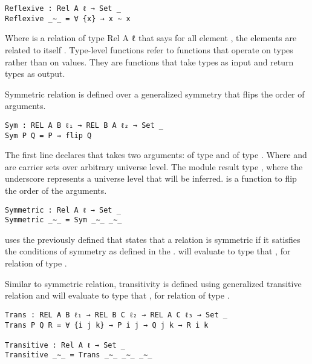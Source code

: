 \begin{verbatim}
Reflexive : Rel A ℓ → Set _
Reflexive _∼_ = ∀ {x} → x ∼ x
\end{verbatim}

Where  is a relation of type {Rel A ℓ} that says for all element
, the elements are related to itself . Type-level
functions refer to functions that operate on types rather than on values. They
are functions that take types as input and return types as output.

Symmetric relation is defined over a generalized symmetry that flips the order of arguments.

\begin{verbatim}
Sym : REL A B ℓ₁ → REL B A ℓ₂ → Set _
Sym P Q = P ⇒ flip Q
\end{verbatim}
The first line declares  that takes two arguments:  of
type  and  of type . Where
 and  are carrier sets over arbitrary universe level. The
module result type , where the underscore represents a universe
level that will be inferred.  is a function to flip the order of
the arguments. 

\begin{verbatim}
Symmetric : Rel A ℓ → Set _
Symmetric _∼_ = Sym _∼_ _∼_
\end{verbatim}

 uses the previously defined  that states that a
relation  is symmetric if it satisfies the conditions of symmetry as
defined in the .  will evaluate to type that
,  for relation  of type
.

Similar to symmetric relation, transitivity is defined using generalized
transitive relation and  will evaluate to type that ,  for relation  of type
.

\begin{verbatim}
Trans : REL A B ℓ₁ → REL B C ℓ₂ → REL A C ℓ₃ → Set _
Trans P Q R = ∀ {i j k} → P i j → Q j k → R i k

Transitive : Rel A ℓ → Set _
Transitive _∼_ = Trans _∼_ _∼_ _∼_
\end{verbatim}

